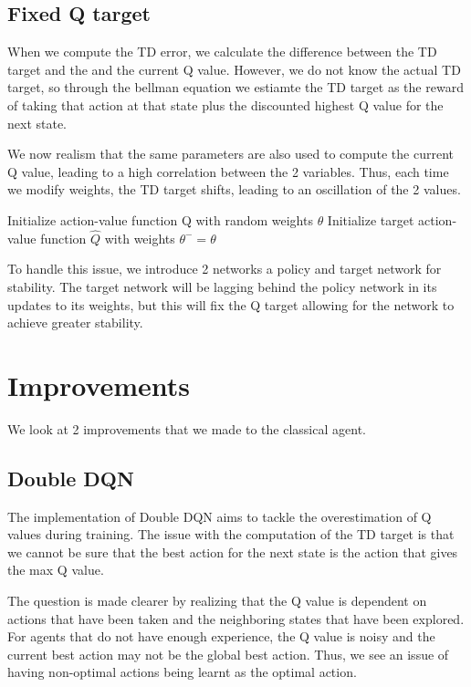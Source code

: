\documentclass{article}
\begin{document}
\subsection*{Fixed Q target}

When we compute the TD error, we calculate the difference between the TD target
and the and the current Q value. However, we do not know the actual TD target, so
through the bellman equation we estiamte the TD target as the reward of taking
that action at that state plus the discounted highest Q value for the next state.

We now realism that the same parameters are also used to compute the current Q
value, leading to a high correlation between the 2 variables. Thus, each time we
modify weights, the TD target shifts, leading to an oscillation of the 2 values.

\begin{displayquote}
    Initialize action-value function Q with random weights $\theta$
    Initialize target action-value function $\hat Q$ with weights $\theta^- = \theta$
\end{displayquote}

To handle this issue, we introduce 2 networks a policy and target network for
stability. The target network will be lagging behind the policy network in its
updates to its weights, but this will fix the Q target allowing for the network
to achieve greater stability.

\section*{Improvements}

We look at 2 improvements that we made to the classical agent.

\subsection*{Double DQN}

The implementation of Double DQN aims to tackle the overestimation of Q values
during training. The issue with the computation of the TD target is that we cannot
be sure that the best action for the next state is the action that gives the max
Q value.

The question is made clearer by realizing that the Q value is dependent on actions
that have been taken and the neighboring states that have been explored. For agents
that do not have enough experience, the Q value is noisy and the current best action
may not be the global best action. Thus, we see an issue of having non-optimal actions
being learnt as the optimal action.
\end{document}
